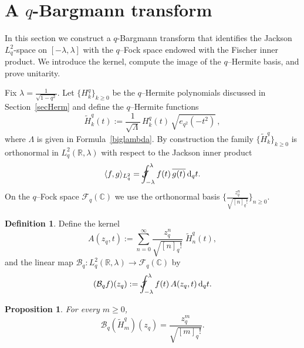 \documentclass[10pt]{amsart}
\theoremstyle{plain}
\newtheorem{proposition}[theorem]{Proposition}
\theoremstyle{definition}
\newtheorem{definition}[theorem]{Definition}
\newcommand{\Jint}{\mathcal{J}\mspace{-20mu}\int  }
\def\ge{\geqslant}
\begin{document}
\section{A $q$-Bargmann transform}%

In this section we construct a $q$-Bargmann transform that identifies the
 Jackson $L^2_{q}$-space on $[-\lambda,\lambda]$ with the $q$–Fock space
endowed with the Fischer inner product. We introduce the kernel,
compute the image of the $q$–Hermite basis, and prove unitarity.


Fix $\lambda=\frac{1}{\sqrt{1-q^2}}$. Let $\{H_k^q\}_{k\ge0}$ be the $q$–Hermite polynomials discussed in Section~\ref{secHerm}
and define the $q$–Hermite functions
\[
\tilde{H}_k^q(t):=\frac{1}{\sqrt{\Lambda}}\,H_k^q(t)\,\sqrt{e_{q^2}(-t^2)}\,,
\]
where $\Lambda$ is given in Formula~\eqref{biglambda}.
By construction the family $\{\tilde{H}_k^q\}_{k\ge0}$ is orthonormal in
$L_q^2(\mathbb{R},\lambda)$ with respect to the Jackson inner product
\[
\langle f,g\rangle_{L^2_q}=\Jint_{-\lambda}^{\lambda} f(t)\,\overline{g(t)}\,\mathrm{d}_q t.
\]
On the $q$–Fock space $\mathcal{F}_q(\mathbb{C})$ we use the orthonormal basis
$\big\{\frac{z_q^n}{\sqrt{[n]_q!}}\big\}_{n\ge0}$.

\begin{definition}
Define the kernel
\begin{equation}\label{eq:Bkernel}
A(z_q,t):=\sum_{n=0}^{\infty}\frac{z_q^n}{\sqrt{[n]_q!}}\;\tilde{H}_n^q(t),
\end{equation}
and the linear map $\mathcal{B}_q:L_q^2(\mathbb{R},\lambda)\to\mathcal{F}_q(\mathbb{C})$ by
\begin{equation}\label{eq:Btransform}
(\mathcal{B}_qf)(z_q):=\Jint_{-\lambda}^{\lambda} f(t)\,A(z_q,t)\,\mathrm{d}_q t.
\end{equation}
\end{definition}

\begin{proposition}\label{prop:BasisImage}
For every $m\ge0$,
$$\mathcal{B}_q(\tilde{H}_m^q)(z_q)=\frac{z_q^m}{\sqrt{[m]_q!}}.
$$\end{proposition}
\end{document}
